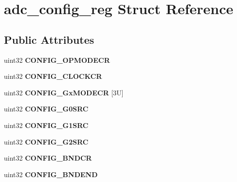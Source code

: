 \hypertarget{structadc__config__reg}{}\section{adc\+\_\+config\+\_\+reg Struct Reference}
\label{structadc__config__reg}
\subsection*{Public Attributes}
\begin{DoxyCompactItemize}
\item 
\mbox{\label{structadc__config__reg_a89f9763bfd15e1038f0c93d0858ef9f5}} 
uint32 {\bfseries C\+O\+N\+F\+I\+G\+\_\+\+O\+P\+M\+O\+D\+E\+CR}
\item 
\mbox{\label{structadc__config__reg_ab862e8c9cd900ce79fec2509beb346ec}} 
uint32 {\bfseries C\+O\+N\+F\+I\+G\+\_\+\+C\+L\+O\+C\+K\+CR}
\item 
\mbox{\label{structadc__config__reg_af380b7d40f9c683aa5de173ced5757ca}} 
uint32 {\bfseries C\+O\+N\+F\+I\+G\+\_\+\+Gx\+M\+O\+D\+E\+CR} \mbox{[}3\+U\mbox{]}
\item 
\mbox{\label{structadc__config__reg_a67eac2e7a7fc3b129ebdbd1f354998b8}} 
uint32 {\bfseries C\+O\+N\+F\+I\+G\+\_\+\+G0\+S\+RC}
\item 
\mbox{\label{structadc__config__reg_a541b2509b820f119a50d1967f6fd2653}} 
uint32 {\bfseries C\+O\+N\+F\+I\+G\+\_\+\+G1\+S\+RC}
\item 
\mbox{\label{structadc__config__reg_a06498056f6c0e1aa8acdc6f1e10b2133}} 
uint32 {\bfseries C\+O\+N\+F\+I\+G\+\_\+\+G2\+S\+RC}
\item 
\mbox{\label{structadc__config__reg_a347f4200e1254e7077f3b5cb8bb444e4}} 
uint32 {\bfseries C\+O\+N\+F\+I\+G\+\_\+\+B\+N\+D\+CR}
\item 
\mbox{\label{structadc__config__reg_a3bc4b1bfe8add9645b53d85e50e5623c}} 
uint32 {\bfseries C\+O\+N\+F\+I\+G\+\_\+\+B\+N\+D\+E\+ND}
\item 

\end{DoxyCompactItemize}
